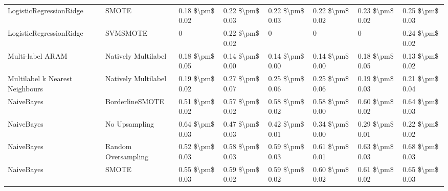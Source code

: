 \begin{tabular}{llllllll}
        LogisticRegressionRidge &                         SMOTE & 0.18 \$\textbackslash pm\$ 0.02 &           0.22 \$\textbackslash pm\$ 0.03 &       0.22 \$\textbackslash pm\$ 0.03 &        0.22 \$\textbackslash pm\$ 0.02 &                         0.23 \$\textbackslash pm\$ 0.02 &     0.25 \$\textbackslash pm\$ 0.03 \\
        LogisticRegressionRidge &                      SVMSMOTE &               0 &           0.22 \$\textbackslash pm\$ 0.02 &                     0 &                      0 &                                       0 &     0.24 \$\textbackslash pm\$ 0.02 \\
               Multi-label ARAM &           Natively Multilabel & 0.18 \$\textbackslash pm\$ 0.05 &           0.14 \$\textbackslash pm\$ 0.00 &       0.14 \$\textbackslash pm\$ 0.00 &        0.14 \$\textbackslash pm\$ 0.00 &                         0.18 \$\textbackslash pm\$ 0.05 &     0.13 \$\textbackslash pm\$ 0.02 \\
Multilabel k Nearest Neighbours &           Natively Multilabel & 0.19 \$\textbackslash pm\$ 0.02 &           0.27 \$\textbackslash pm\$ 0.07 &       0.25 \$\textbackslash pm\$ 0.06 &        0.25 \$\textbackslash pm\$ 0.06 &                         0.19 \$\textbackslash pm\$ 0.03 &     0.21 \$\textbackslash pm\$ 0.04 \\
                     NaiveBayes &               BorderlineSMOTE & 0.51 \$\textbackslash pm\$ 0.02 &           0.57 \$\textbackslash pm\$ 0.02 &       0.58 \$\textbackslash pm\$ 0.02 &        0.58 \$\textbackslash pm\$ 0.00 &                         0.60 \$\textbackslash pm\$ 0.02 &     0.64 \$\textbackslash pm\$ 0.03 \\
                     NaiveBayes &                 No Upsampling & 0.64 \$\textbackslash pm\$ 0.03 &           0.47 \$\textbackslash pm\$ 0.03 &       0.42 \$\textbackslash pm\$ 0.01 &        0.34 \$\textbackslash pm\$ 0.00 &                         0.29 \$\textbackslash pm\$ 0.01 &     0.22 \$\textbackslash pm\$ 0.02 \\
                     NaiveBayes &           Random Oversampling & 0.52 \$\textbackslash pm\$ 0.03 &           0.58 \$\textbackslash pm\$ 0.03 &       0.59 \$\textbackslash pm\$ 0.03 &        0.61 \$\textbackslash pm\$ 0.01 &                         0.63 \$\textbackslash pm\$ 0.03 &     0.68 \$\textbackslash pm\$ 0.03 \\
                     NaiveBayes &                         SMOTE & 0.55 \$\textbackslash pm\$ 0.03 &           0.59 \$\textbackslash pm\$ 0.02 &       0.59 \$\textbackslash pm\$ 0.02 &        0.60 \$\textbackslash pm\$ 0.02 &                         0.61 \$\textbackslash pm\$ 0.02 &     0.65 \$\textbackslash pm\$ 0.03 \\

\end{tabular}
